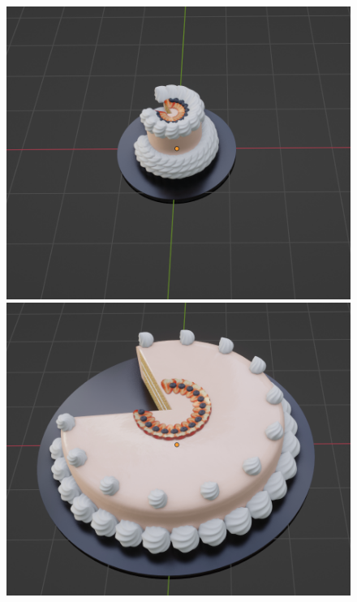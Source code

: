 \begin{figure}[h]
 \begin{minipage}[b]{0.48\linewidth}
  \centering
  \includegraphics[scale=0.25]{./imgs/cakeParamMean/radiusMin.png}
 \end{minipage}
 \begin{minipage}[b]{0.48\linewidth}
  \centering
  \includegraphics[scale=0.25]{./imgs/cakeParamMean/radiusMax.png}

\end{minipage}
\end{figure}
